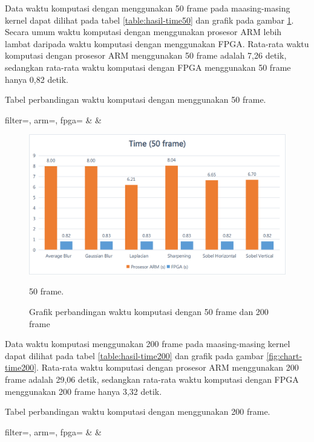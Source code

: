 Data waktu komputasi dengan menggunakan 50 frame pada maasing-masing kernel dapat dilihat pada tabel \ref{table:hasil-time50} dan grafik pada gambar \ref{fig:chart-time50}. Secara umum waktu komputasi dengan menggunakan prosesor ARM lebih lambat daripada waktu komputasi dengan menggunakan FPGA. Rata-rata waktu komputasi dengan prosesor ARM menggunakan 50 frame adalah 7,26 detik, sedangkan rata-rata waktu komputasi dengan FPGA menggunakan 50 frame hanya 0,82 detik.
\begin{atable}
    \caption{Tabel perbandingan waktu komputasi dengan menggunakan 50 frame.}
    \label{table:hasil-time50}
        {
            filter=\filter, 
            arm=\arm, 
            fpga=\fpga}
        {
            \filter & 
            \arm & 
            \fpga }
\end{atable}
\begin{figure}[H]
    \centering
    \includegraphics[width=0.81\linewidth, center]{images/chart/chart-time50.png}
    \caption{50 frame.}
    \label{fig:chart-time50}
    \caption{Grafik perbandingan waktu komputasi dengan 50 frame dan 200 frame}
\end{figure}

Data waktu komputasi menggunakan 200 frame pada maasing-masing kernel dapat dilihat pada tabel \ref{table:hasil-time200} dan grafik pada gambar \ref{fig:chart-time200}. Rata-rata waktu komputasi dengan prosesor ARM menggunakan 200 frame adalah 29,06 detik, sedangkan rata-rata waktu komputasi dengan FPGA menggunakan 200 frame hanya 3,32 detik.
\begin{atable}
    \caption{Tabel perbandingan waktu komputasi dengan menggunakan 200 frame.}
    \label{table:hasil-time200}
        {
            filter=\filter, 
            arm=\arm, 
            fpga=\fpga}
        {
            \filter & 
            \arm & 
            \fpga }
\end{atable}

